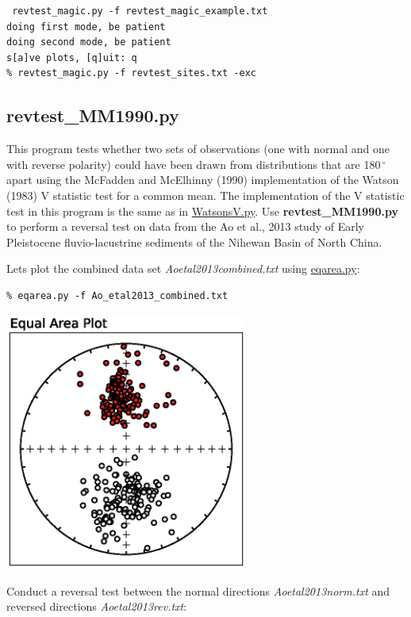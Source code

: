 \documentclass[11pt]{book}
\begin{document}
{{{\begin{verbatim}
 revtest_magic.py -f revtest_magic_example.txt 
doing first mode, be patient
doing second mode, be patient
s[a]ve plots, [q]uit: q
% revtest_magic.py -f revtest_sites.txt -exc
\end{verbatim} 

\subsection{revtest\_MM1990.py} 

This program tests whether two sets of observations (one with normal and one with reverse polarity) could have been drawn from distributions that are 180$\,^{\circ}$ apart using the McFadden and McElhinny (1990) implementation of the Watson (1983) V statistic test for a common mean. The implementation of the V statistic test in this program is the same as in \href{#WatsonsV.py}{WatsonsV.py}. Use \textbf{revtest\_MM1990.py} to perform a reversal test on data from the Ao et al., 2013 study of Early Pleistocene fluvio-lacustrine sediments of the Nihewan Basin of North China.

Lets plot the combined data set \textit{Ao\textunderscore etal2013\textunderscore combined.txt} using \href{#eqarea.py}{eqarea.py}:

\begin{verbatim}
% eqarea.py -f Ao_etal2013_combined.txt
\end{verbatim}

\includegraphics[width=8cm]{EPSfiles/Ao2013eq.eps}}

Conduct a reversal test between the normal directions \textit{Ao\textunderscore etal2013\textunderscore norm.txt} and reversed directions \textit{Ao\textunderscore etal2013\textunderscore rev.txt}:

}}
\end{document}
